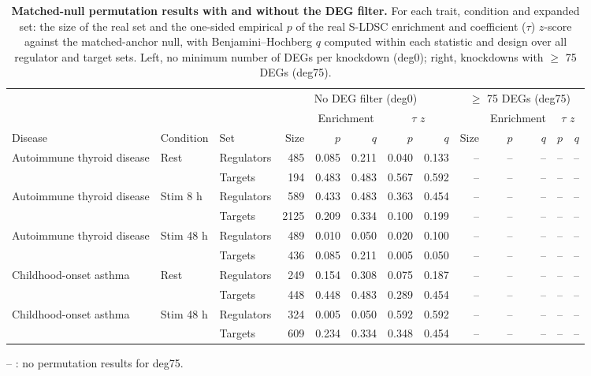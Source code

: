 \begin{table}[tbp]
\centering
\caption[Matched-null permutation results with and without the DEG filter]{\textbf{Matched-null permutation results with and without the DEG filter.} For each trait, condition and expanded set: the size of the real set and the one-sided empirical $p$ of the real S-LDSC enrichment and coefficient ($\tau$) $z$-score against the matched-anchor null, with Benjamini--Hochberg $q$ computed within each statistic and design over all regulator and target sets. Left, no minimum number of DEGs per knockdown (deg0); right, knockdowns with $\geq$ 75 DEGs (deg75).}
\label{tab:deg_filter_perm}
\vspace{4pt}
\small
\setlength{\tabcolsep}{3pt}
\begin{tabularx}{\linewidth}{@{}>{\raggedright\arraybackslash}X l l r r r r r r r r r r@{}}
\toprule
 & & & \multicolumn{5}{c}{No DEG filter (deg0)} & \multicolumn{5}{c}{$\geq$ 75 DEGs (deg75)} \\
\cmidrule(lr){4-8}\cmidrule(lr){9-13}
 & & &  & \multicolumn{2}{c}{Enrichment} & \multicolumn{2}{c}{$\tau$ $z$} &  & \multicolumn{2}{c}{Enrichment} & \multicolumn{2}{c}{$\tau$ $z$} \\
\cmidrule(lr){5-6}\cmidrule(lr){7-8}\cmidrule(lr){10-11}\cmidrule(lr){12-13}
Disease & Condition & Set & Size & $p$ & $q$ & $p$ & $q$ & Size & $p$ & $q$ & $p$ & $q$ \\
\midrule
Autoimmune thyroid disease & Rest & Regulators & 485 & 0.085 & 0.211 & 0.040 & 0.133 & -- & -- & -- & -- & -- \\
 &  & Targets & 194 & 0.483 & 0.483 & 0.567 & 0.592 & -- & -- & -- & -- & -- \\
\addlinespace
Autoimmune thyroid disease & Stim 8 h & Regulators & 589 & 0.433 & 0.483 & 0.363 & 0.454 & -- & -- & -- & -- & -- \\
 &  & Targets & 2125 & 0.209 & 0.334 & 0.100 & 0.199 & -- & -- & -- & -- & -- \\
\addlinespace
Autoimmune thyroid disease & Stim 48 h & Regulators & 489 & 0.010 & 0.050 & 0.020 & 0.100 & -- & -- & -- & -- & -- \\
 &  & Targets & 436 & 0.085 & 0.211 & 0.005 & 0.050 & -- & -- & -- & -- & -- \\
\addlinespace
Childhood-onset asthma & Rest & Regulators & 249 & 0.154 & 0.308 & 0.075 & 0.187 & -- & -- & -- & -- & -- \\
 &  & Targets & 448 & 0.448 & 0.483 & 0.289 & 0.454 & -- & -- & -- & -- & -- \\
\addlinespace
Childhood-onset asthma & Stim 48 h & Regulators & 324 & 0.005 & 0.050 & 0.592 & 0.592 & -- & -- & -- & -- & -- \\
 &  & Targets & 609 & 0.234 & 0.334 & 0.348 & 0.454 & -- & -- & -- & -- & -- \\
\bottomrule
\end{tabularx}
\par\smallskip
{\footnotesize\raggedright -- : no permutation results for deg75.\par}
\end{table}
